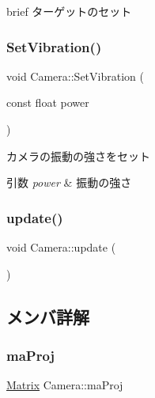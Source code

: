 brief ターゲットのセット \mbox{\label{class_camera_a09492c284cfd0a909d6084297c577e03}} 
\subsubsection{\texorpdfstring{Set\+Vibration()}{SetVibration()}}
{\footnotesize\ttfamily void Camera\+::\+Set\+Vibration (\begin{DoxyParamCaption}\item[{const float}]{power }\end{DoxyParamCaption})\hspace{0.3cm}{\ttfamily [inline]}}



カメラの振動の強さをセット 


\begin{DoxyParams}{引数}
{\em power} & 振動の強さ \\
\hline
\end{DoxyParams}
\mbox{\label{class_camera_a42cda7239981a5618660d04bd5893556}} 
\subsubsection{\texorpdfstring{update()}{update()}}
{\footnotesize\ttfamily void Camera\+::update (\begin{DoxyParamCaption}{ }\end{DoxyParamCaption})}



\subsection{メンバ詳解}
\mbox{\label{class_camera_aad6337f1b3a5528df50ab0fe0f3ad1cb}} 
\subsubsection{\texorpdfstring{ma\+Proj}{maProj}}
{\footnotesize\ttfamily \mbox{\hyperlink{common_8h_ac6b2f2a47a728f9de5b5700d5aea93de}{Matrix}} Camera\+::ma\+Proj}


